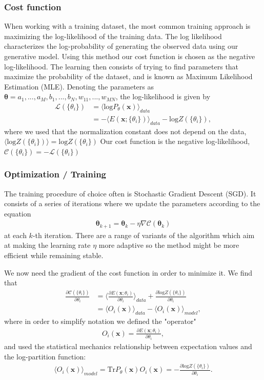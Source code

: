 \documentclass{beamer}
\begin{document}
\begin{frame}
\frametitle{Cost function}

When working with a training dataset, the most common training approach is maximizing the log-likelihood of the training data. The log likelihood characterizes the log-probability of generating the observed data using our generative model. Using this method our cost function is chosen as the negative log-likelihood. The learning then consists of trying to find parameters that maximize the probability of the dataset, and is known as Maximum Likelihood Estimation (MLE).
Denoting the parameters as $\bm{\theta} = a_1,...,a_M,b_1,...,b_N,w_{11},...,w_{MN}$, the log-likelihood is given by
\begin{align}
	\mathcal{L}(\{ \theta_i \}) &= \langle \text{log} P_\theta(\bm{x}) \rangle_{data} \\
	&= - \langle E(\bm{x}; \{ \theta_i\}) \rangle_{data} - \text{log} Z(\{ \theta_i\}),
\end{align}
where we used that the normalization constant does not depend on the data, $\langle \text{log} Z(\{ \theta_i\}) \rangle = \text{log} Z(\{ \theta_i\})$
Our cost function is the negative log-likelihood, $\mathcal{C}(\{ \theta_i \}) = - \mathcal{L}(\{ \theta_i \})$
\end{frame}

\begin{frame}
\frametitle{Optimization / Training}

The training procedure of choice often is Stochastic Gradient Descent (SGD). It consists of a series of iterations where we update the parameters according to the equation
\begin{align}
	\bm{\theta}_{k+1} = \bm{\theta}_k - \eta \nabla \mathcal{C} (\bm{\theta}_k)
\end{align}
at each $k$-th iteration. There are a range of variants of the algorithm which aim at making the learning rate $\eta$ more adaptive so the method might be more efficient while remaining stable.

We now need the gradient of the cost function in order to minimize it. We find that
\begin{align}
	\frac{\partial \mathcal{C}(\{ \theta_i\})}{\partial \theta_i}
	&= \langle \frac{\partial E(\bm{x}; \theta_i)}{\partial \theta_i} \rangle_{data}
	+ \frac{\partial \text{log} Z(\{ \theta_i\})}{\partial \theta_i} \\
	&= \langle O_i(\bm{x}) \rangle_{data} - \langle O_i(\bm{x}) \rangle_{model},
\end{align}
where in order to simplify notation we defined the "operator"
\begin{align}
	O_i(\bm{x}) = \frac{\partial E(\bm{x}; \theta_i)}{\partial \theta_i}, 
\end{align}
and used the statistical mechanics relationship between expectation values and the log-partition function:
\begin{align}
	\langle O_i(\bm{x}) \rangle_{model} = \text{Tr} P_\theta(\bm{x})O_i(\bm{x}) = - \frac{\partial \text{log} Z(\{ \theta_i\})}{\partial \theta_i}.
\end{align}
\end{frame}
\end{document}
